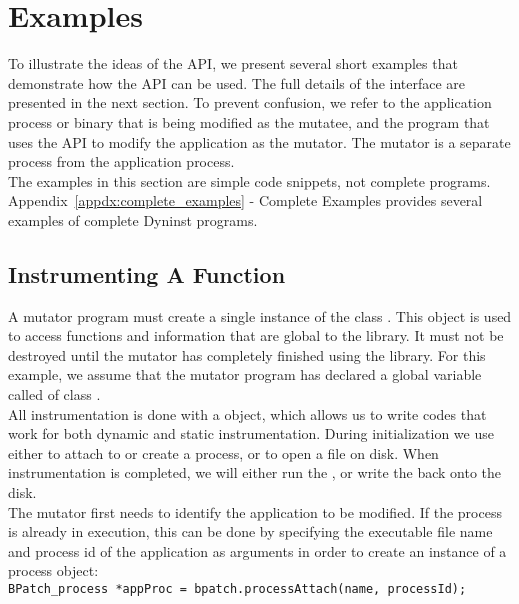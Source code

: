 \section{Examples}

To illustrate the ideas of the API, we present several short examples that demonstrate how the API can be used.  The full details of the interface are presented in the next section.  To prevent confusion, we refer to the application process or binary that is being modified as the mutatee, and the program that uses the API to modify the application as the mutator.  The mutator is a separate process from the application process.\\

The examples in this section are simple code snippets, not complete programs.  Appendix~\ref{appdx:complete_examples} - Complete Examples provides several examples of complete Dyninst programs.

\subsection{Instrumenting A Function}

A mutator program must create a single instance of the class \BPatch.  This object is used to access functions and information that are global to the library.  It must not be destroyed until the mutator has completely finished using the library.  For this example, we assume that the mutator program has declared a global variable called \bpatch of class \BPatch.\\
All instrumentation is done with a \BPatchaddressSpace object, which allows us to write codes that work for both dynamic and static instrumentation.  During initialization we use either \BPatchprocess to attach to or create a process, or \BPatchbinaryEdit to open a file on disk.  When instrumentation is completed, we will either run the \BPatchprocess, or write the \BPatchbinaryEdit back onto the disk.\\

The mutator first needs to identify the application to be modified.  If the process is already in execution, this can be done by specifying the executable file name and process id of the application as arguments in order to create an instance of a process object: \\

\texttt{BPatch\_process *appProc = bpatch.processAttach(name, processId);}\\

